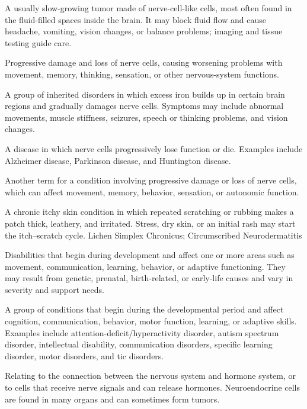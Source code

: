  A usually slow-growing tumor made of nerve-cell-like cells, most often found in the fluid-filled spaces inside the brain. It may block fluid flow and cause headache, vomiting, vision changes, or balance problems; imaging and tissue testing guide care.

 Progressive damage and loss of nerve cells, causing worsening problems with movement, memory, thinking, sensation, or other nervous-system functions.

 A group of inherited disorders in which excess iron builds up in certain brain regions and gradually damages nerve cells. Symptoms may include abnormal movements, muscle stiffness, seizures, speech or thinking problems, and vision changes.

 A disease in which nerve cells progressively lose function or die. Examples include Alzheimer disease, Parkinson disease, and Huntington disease.

 Another term for a condition involving progressive damage or loss of nerve cells, which can affect movement, memory, behavior, sensation, or autonomic function.

 A chronic itchy skin condition in which repeated scratching or rubbing makes a patch thick, leathery, and irritated. Stress, dry skin, or an initial rash may start the itch–scratch cycle.
\synonyms
Lichen Simplex Chronicus; Circumscribed Neurodermatitis

 Disabilities that begin during development and affect one or more areas such as movement, communication, learning, behavior, or adaptive functioning. They may result from genetic, prenatal, birth-related, or early-life causes and vary in severity and support needs.

 A group of conditions that begin during the developmental period and affect cognition, communication, behavior, motor function, learning, or adaptive skills. Examples include attention-deficit/hyperactivity disorder, autism spectrum disorder, intellectual disability, communication disorders, specific learning disorder, motor disorders, and tic disorders.

 Relating to the connection between the nervous system and hormone system, or to cells that receive nerve signals and can release hormones. Neuroendocrine cells are found in many organs and can sometimes form tumors.

